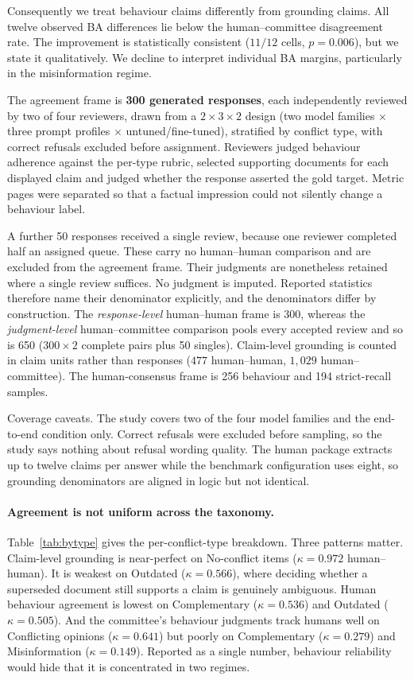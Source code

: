 Consequently we treat behaviour claims differently from grounding claims. All
twelve observed BA differences lie below the human--committee disagreement rate.
The improvement is statistically consistent ($11/12$ cells, $p=0.006$),
but we state it qualitatively. We decline to interpret individual BA margins,
particularly in the misinformation regime.

The agreement frame is \textbf{300 generated responses}, each independently
reviewed by two of four reviewers, drawn from a $2\times3\times2$ design (two
model families $\times$ three prompt profiles $\times$ untuned/fine-tuned),
stratified by conflict type, with correct refusals excluded before assignment.
Reviewers judged behaviour
adherence against the per-type rubric, selected supporting documents for each
displayed claim and judged whether the response asserted the gold target.
Metric pages were separated so that a factual impression could not silently
change a behaviour label.

A further 50 responses received a single review, because one reviewer completed
half an assigned queue. These carry no human--human comparison and are excluded
from the agreement frame. Their judgments are nonetheless retained where a single
review suffices. No judgment is imputed. Reported statistics therefore name
their denominator explicitly, and the denominators differ by construction. The
\emph{response-level} human--human frame is 300, whereas the \emph{judgment-level}
human--committee comparison pools every accepted review and so is 650
($300\times2$ complete pairs plus 50 singles). Claim-level grounding is counted
in claim units rather than responses ($477$ human--human, $1{,}029$
human--committee). The human-consensus frame is 256 behaviour and 194
strict-recall samples.

Coverage caveats. The study covers two of the four model families and the
end-to-end condition only. Correct refusals were excluded before sampling, so the
study says nothing about refusal wording quality. The human package extracts up
to twelve claims per answer while the benchmark configuration uses eight, so
grounding denominators are aligned in logic but not identical.

\paragraph{Agreement is not uniform across the taxonomy.} Table~\ref{tab:bytype}
gives the per-conflict-type breakdown. Three patterns matter. Claim-level
grounding is near-perfect on No-conflict items ($\kappa=0.972$ human--human). It is
weakest on Outdated ($\kappa=0.566$), where deciding whether a superseded
document still supports a claim is genuinely ambiguous. Human behaviour agreement
is lowest on Complementary ($\kappa=0.536$) and Outdated ($\kappa=0.505$). And
the committee's behaviour judgments track humans well on Conflicting opinions
($\kappa=0.641$) but poorly on Complementary ($\kappa=0.279$) and Misinformation
($\kappa=0.149$). Reported as a single number, behaviour reliability would hide
that it is concentrated in two regimes.


